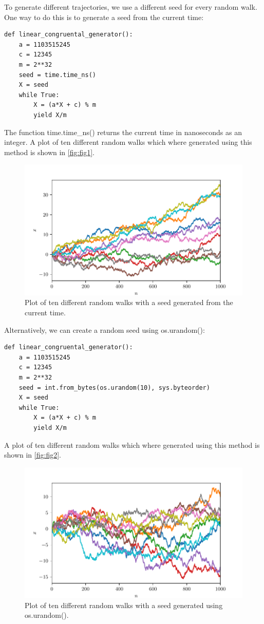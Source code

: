 \documentclass[a4paper,10pt,bibtotoc]{scrartcl}
\begin{document}
To generate different trajectories, we use a different seed for every random walk.
One way to do this is to generate a seed from the current time:
\begin{lstlisting}
def linear_congruental_generator():
    a = 1103515245
    c = 12345
    m = 2**32
    seed = time.time_ns()
    X = seed
    while True:
        X = (a*X + c) % m
        yield X/m
\end{lstlisting}
The function time.time\_ns() returns the current time in nanoseconds as an integer.
A plot of ten different random walks which where generated using this method is shown in \autoref{fig:fig1}.
\begin{figure}[H]
	\centering
	\includegraphics[width=\linewidth]{random_walk_time.pdf}
	\caption{Plot of ten different random walks with a seed generated from the current time.}
	\label{fig:fig1}
\end{figure}
\noindent Alternatively, we can create a random seed using os.urandom():
\begin{lstlisting}
def linear_congruental_generator():
    a = 1103515245
    c = 12345
    m = 2**32
    seed = int.from_bytes(os.urandom(10), sys.byteorder)
    X = seed
    while True:
        X = (a*X + c) % m
        yield X/m
\end{lstlisting}
A plot of ten different random walks which where generated using this method is shown in \autoref{fig:fig2}.
\begin{figure}[H]
	\centering
	\includegraphics[width=\linewidth]{random_walk_os.pdf}
	\caption{Plot of ten different random walks with a seed generated using os.urandom().}
	\label{fig:fig2}
\end{figure}
\end{document}
